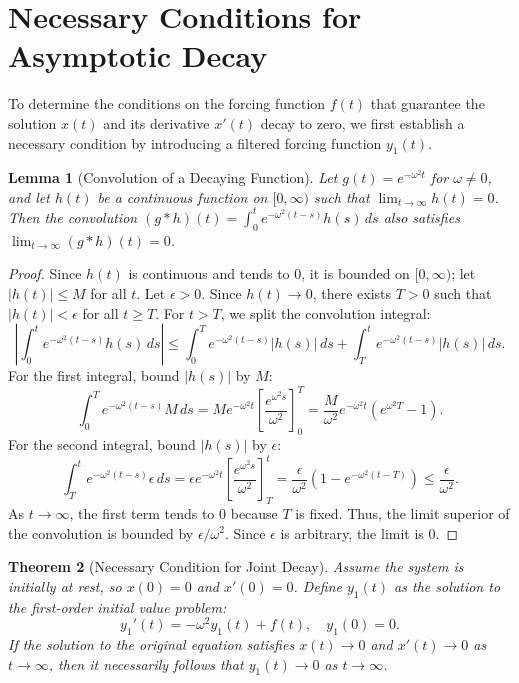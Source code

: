 \documentclass[10pt,reqno]{amsart}
\newtheorem{theorem}{Theorem}
\newtheorem{lemma}[theorem]{Lemma}
\theoremstyle{definition}
\begin{document}
	\section{Necessary Conditions for Asymptotic Decay}
	
	To determine the conditions on the forcing function $f(t)$ that guarantee the solution $x(t)$ and its derivative $x'(t)$ decay to zero, we first establish a necessary condition by introducing a filtered forcing function $y_1(t)$.
	
	\begin{lemma}[Convolution of a Decaying Function] \label{lem:convolution}
		Let $g(t) = e^{-\omega^2 t}$ for $\omega \neq 0$, and let $h(t)$ be a continuous function on $[0, \infty)$ such that $\lim_{t \to \infty} h(t) = 0$. Then the convolution $(g * h)(t) = \int_0^t e^{-\omega^2(t-s)} h(s) \, ds$ also satisfies $\lim_{t \to \infty} (g * h)(t) = 0$.
	\end{lemma}
	
	\begin{proof}
		Since $h(t)$ is continuous and tends to $0$, it is bounded on $[0, \infty)$; let $|h(t)| \le M$ for all $t$. Let $\epsilon > 0$. Since $h(t) \to 0$, there exists $T > 0$ such that $|h(t)| < \epsilon$ for all $t \ge T$. For $t > T$, we split the convolution integral:
		\[ \left| \int_0^t e^{-\omega^2(t-s)} h(s) \, ds \right| \le \int_0^T e^{-\omega^2(t-s)} |h(s)| \, ds + \int_T^t e^{-\omega^2(t-s)} |h(s)| \, ds. \]
		For the first integral, bound $|h(s)|$ by $M$:
		\[ \int_0^T e^{-\omega^2(t-s)} M \, ds = M e^{-\omega^2 t} \left[ \frac{e^{\omega^2 s}}{\omega^2} \right]_0^T = \frac{M}{\omega^2} e^{-\omega^2 t} (e^{\omega^2 T} - 1). \]
		For the second integral, bound $|h(s)|$ by $\epsilon$:
		\[ \int_T^t e^{-\omega^2(t-s)} \epsilon \, ds = \epsilon e^{-\omega^2 t} \left[ \frac{e^{\omega^2 s}}{\omega^2} \right]_T^t = \frac{\epsilon}{\omega^2} (1 - e^{-\omega^2(t-T)}) \le \frac{\epsilon}{\omega^2}. \]
		As $t \to \infty$, the first term tends to $0$ because $T$ is fixed. Thus, the limit superior of the convolution is bounded by $\epsilon/\omega^2$. Since $\epsilon$ is arbitrary, the limit is $0$.
	\end{proof}
	
	\begin{theorem}[Necessary Condition for Joint Decay]
		Assume the system is initially at rest, so $x(0) = 0$ and $x'(0) = 0$. Define $y_1(t)$ as the solution to the first-order initial value problem:
		\[ y_1'(t) = -\omega^2 y_1(t) + f(t), \quad y_1(0) = 0. \]
		If the solution to the original equation satisfies $x(t) \to 0$ and $x'(t) \to 0$ as $t \to \infty$, then it necessarily follows that $y_1(t) \to 0$ as $t \to \infty$.
	\end{theorem}
	
\end{document}
